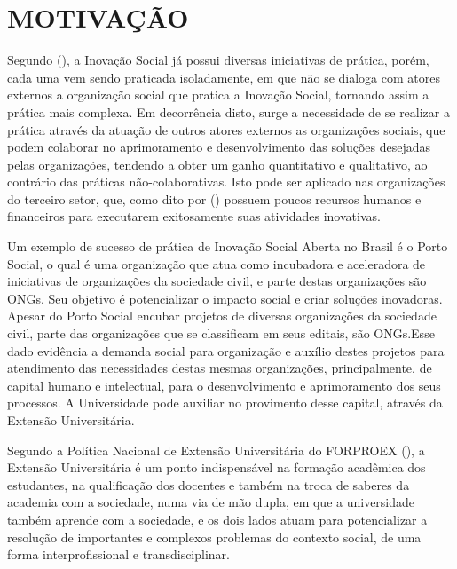 \section{MOTIVAÇÃO}
\label{motivacao}

Segundo \citeauthor{pinheiro2020} (\citeyear{pinheiro2020}), a Inovação Social já possui diversas iniciativas de prática, porém, cada uma vem sendo praticada isoladamente, em que não se dialoga com atores externos a organização social que pratica a Inovação Social, tornando assim a prática mais complexa. Em decorrência disto, surge a necessidade de se realizar a prática através da atuação de outros atores externos as organizações sociais, que podem colaborar no aprimoramento e desenvolvimento das soluções desejadas pelas organizações, tendendo a obter um ganho quantitativo e qualitativo, ao contrário das práticas não-colaborativas. Isto pode ser aplicado nas organizações do terceiro setor, que, como dito por \citeauthor{gama2023} (\citeyear{gama2023}) possuem poucos recursos humanos e financeiros para executarem exitosamente suas atividades inovativas.

Um exemplo de sucesso de prática de Inovação Social Aberta no Brasil é o Porto Social, o qual é uma organização que atua como incubadora e aceleradora de iniciativas de organizações da sociedade civil, e parte destas organizações são \gls{ONG}s. Seu objetivo é potencializar o impacto social e criar soluções inovadoras. Apesar do Porto Social encubar projetos de diversas organizações da sociedade civil, parte das organizações que se classificam em seus editais, são ONGs.Esse dado evidência a demanda social para organização e auxílio destes projetos para atendimento das necessidades destas mesmas organizações, principalmente, de capital humano e intelectual, para o desenvolvimento e aprimoramento dos seus processos. A Universidade pode auxiliar no provimento desse capital, através da Extensão Universitária. \cite{portosocial2023}

Segundo a Política Nacional de Extensão Universitária do \gls{FORPROEX} (\citeyear{forproex2016}), a Extensão Universitária é um ponto indispensável na formação acadêmica dos estudantes, na qualificação dos docentes e também na troca de saberes da academia com a sociedade, numa via de mão dupla, em que a universidade também aprende com a sociedade, e os dois lados atuam para potencializar a resolução de importantes e complexos problemas do contexto social, de uma forma interprofissional e transdisciplinar.




